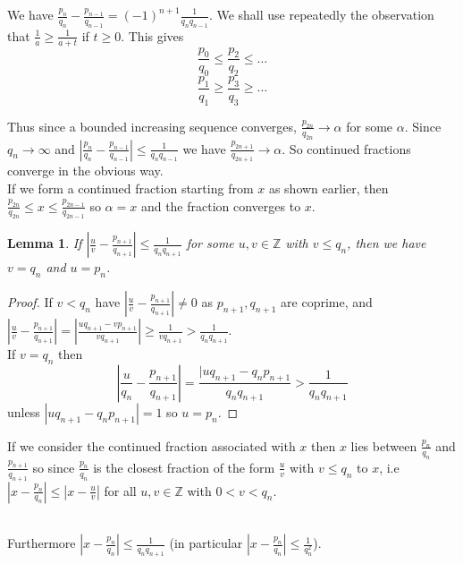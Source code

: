 \documentclass[a4paper, 10pt, twocolumn]{amsart}
\newtheorem*{lemma}{Lemma}
\theoremstyle{definition}
\newcommand{\bb}[1]{\mathbb{#1}}
\newcommand{\1}{\mathbbm{1}}
\begin{document}
We have $\frac{p_n}{q_n}-\frac{p_{n-1}}{q_{n-1}} = (-1)^{n+1} \frac{1}{q_nq_{n-1}}$. We shall use repeatedly the observation that $\frac{1}{a} \ge \frac{1}{a+t}$ if $t\ge 0$. This gives \[\frac{p_0}{q_0} \le \frac{p_2}{q_2} \le \ldots \]
\[\frac{p_1}{q_1} \ge \frac{p_3}{q_3} \ge \ldots\]

Thus since a bounded increasing sequence converges, $\frac{p_{2n}}{q_{2n}} \to \alpha$ for some $\alpha$. Since $q_n \to \infty$ and $\left|\frac{p_n}{q_n}-\frac{p_{n-1}}{q_{n-1}}\right| \le \frac{1}{q_nq_{n-1}}$ we have $\frac{p_{2n+1}}{q_{2n+1}} \to \alpha$. So continued fractions converge in the obvious way.\\

If we form a continued fraction starting from $x$ as shown earlier, then $\frac{p_{2n}}{q_{2n}} \le x\le \frac{p_{2n-1}}{q_{2n-1}}$ so $\alpha =x$ and the fraction converges to $x$.\\

\begin{lemma}
    If $\left|\frac{u}{v} - \frac{p_{n+1}}{q_{n+1}}\right| \le \frac{1}{q_nq_{n+1}}$ for some $u,v \in \bb{Z}$ with $v \le q_n$, then we have $v = q_n$ and $u = p_n$.
\end{lemma}

\begin{proof}
    If $v< q_n$ have $\left|\frac{u}{v} - \frac{p_{n+1}}{q_{n+1}}\right| \ne 0$ as $p_{n+1},q_{n+1}$ are coprime, and $\left|\frac{u}{v}-\frac{p_{n+1}}{q_{n+1}}\right| = \left|\frac{uq_{n+1}-vp_{n+1}}{vq_{n+1}} \right|\ge \frac{1}{vq_{n+1}} > \frac{1}{q_nq_{n+1}}$. \\

    If $v = q_n$ then \[\left|\frac{u}{q_n}-\frac{p_{n+1}}{q_{n+1}}\right| = \frac{|uq_{n+1}-q_np_{n+1}}{q_nq_{n+1}} > \frac{1}{q_nq_{n+1}}\]
    unless $|uq_{n+1}-q_np_{n+1}| = 1$ so $u=p_n$.
\end{proof}

If we consider the continued fraction associated with $x$ then $x$ lies between $\frac{p_n}{q_n}$ and $\frac{p_{n+1}}{q_{n+1}}$ so since $\frac{p_n}{q_n}$ is the closest fraction of the form $\frac{u}{v}$ with $v\le q_n$ to $x$, i.e $\left|x-\frac{p_n}{q_{n}}\right| \le\left|x-\frac{u}{v}\right|$ for all $u,v \in \bb{Z}$ with $0<v<q_n$.\\\

Furthermore $\left|x-\frac{p_n}{q_n}\right|\le \frac{1}{q_nq_{n+1}}$ (in particular $\left|x-\frac{p_n}{q_n}\right| \le \frac{1}{q_n^2}$).\\
\end{document}
